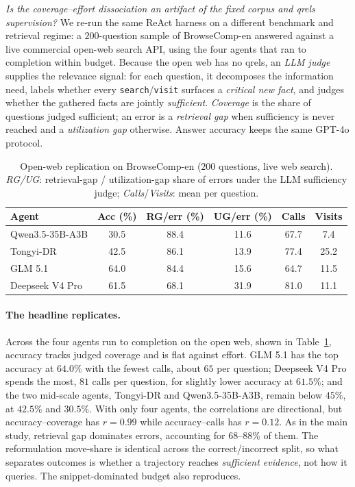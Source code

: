 \emph{Is the coverage--effort dissociation an artifact of the fixed corpus and qrels supervision?} We re-run the same ReAct harness on a different benchmark and retrieval regime: a $200$-question sample of BrowseComp-en \citep{Wei2025BrowseCompASimple} answered against a live commercial open-web search API, using the four agents that ran to completion within budget. Because the open web has no qrels, an \emph{LLM judge} supplies the relevance signal: for each question, it decomposes the information need, labels whether every \texttt{search}/\texttt{visit} surfaces a \emph{critical new fact}, and judges whether the gathered facts are jointly \emph{sufficient}. \emph{Coverage} is the share of questions judged sufficient; an error is a \emph{retrieval gap} when sufficiency is never reached and a \emph{utilization gap} otherwise. Answer accuracy keeps the same GPT-4o protocol.

\ifcompact\else
\begin{table}[t]
\centering
\footnotesize
\setlength{\tabcolsep}{3pt}
\caption{Open-web replication on BrowseComp-en ($200$ questions, live web search). \emph{RG/UG}: retrieval-gap / utilization-gap share of errors under the LLM sufficiency judge; \emph{Calls}/\emph{Visits}: mean per question.}
\label{tab:openweb-overall}
\begin{tabular}{lccccc}
\toprule
Agent & Acc (\%) & RG/err (\%) & UG/err (\%) & Calls & Visits \\
\midrule
Qwen3.5-35B-A3B        & 30.5 & 88.4 & 11.6 & 67.7 &  7.4 \\
Tongyi-DR              & 42.5 & 86.1 & 13.9 & 77.4 & 25.2 \\
\midrule
GLM 5.1                & 64.0 & 84.4 & 15.6 & 64.7 & 11.5 \\
Deepseek V4 Pro        & 61.5 & 68.1 & 31.9 & 81.0 & 11.1 \\
\bottomrule
\end{tabular}
\end{table}
\fi

\paragraph{The headline replicates.} Across the four agents run to completion on the open web\ifcompact\else, shown in Table~\ref{tab:openweb-overall}\fi, accuracy tracks judged coverage and is flat against effort. GLM 5.1 has the top accuracy at $64.0\%$ with the fewest calls, about $65$ per question; Deepseek V4 Pro spends the most, $81$ calls per question, for slightly lower accuracy at $61.5\%$; and the two mid-scale agents, Tongyi-DR and Qwen3.5-35B-A3B, remain below $45\%$, at $42.5\%$ and $30.5\%$. With only four agents, the correlations are directional, but accuracy--coverage has $r = 0.99$ while accuracy--calls has $r = 0.12$. As in the main study, retrieval gap dominates errors, accounting for $68\text{--}88\%$ of them. The reformulation move-share is identical across the correct/incorrect split, so what separates outcomes is whether a trajectory reaches \emph{sufficient evidence}, not how it queries. The snippet-dominated budget also reproduces.

